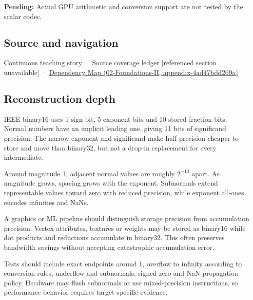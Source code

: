\textbf{Pending:} Actual GPU arithmetic and conversion support are not tested by the scalar codec.

\subsection{Source and navigation}\label{appendix-34443cec7170-source-and-navigation}

\hyperref[01-foundations-i-ch001-choosing-what-information-to-keep]{Continuous teaching story} · {Source coverage ledger {[}referenced section unavailable{]}} · \href{../02-Foundations-II/main.pdf\#nameddest=appendix-4ad47bdd269a}{Dependency Map (02-Foundations-II, appendix-4ad47bdd269a)}

\subsection{Reconstruction depth}\label{appendix-34443cec7170-reconstruction-depth}

IEEE binary16 uses 1 sign bit, 5 exponent bits and 10 stored fraction bits. Normal numbers have an implicit leading one, giving 11 bits of significand precision. The narrow exponent and significand make half precision cheaper to store and move than binary32, but not a drop-in replacement for every intermediate.

Around magnitude 1, adjacent normal values are roughly \(2^{-10}\) apart. As magnitude grows, spacing grows with the exponent. Subnormals extend representable values toward zero with reduced precision, while exponent all-ones encodes infinities and NaNs.

A graphics or ML pipeline should distinguish storage precision from accumulation precision. Vertex attributes, textures or weights may be stored as binary16 while dot products and reductions accumulate in binary32. This often preserves bandwidth savings without accepting catastrophic accumulation error.

Tests should include exact endpoints around 1, overflow to infinity according to conversion rules, underflow and subnormals, signed zero and NaN propagation policy. Hardware may flush subnormals or use mixed-precision instructions, so performance behavior requires target-specific evidence.
